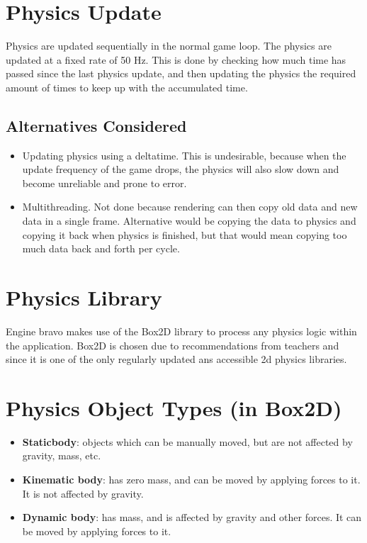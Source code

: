 \section{Physics Update}
Physics are updated sequentially in the normal game loop.
The physics are updated at a fixed rate of 50 Hz. This is done by checking how much time has passed since the last physics update, and then updating the physics the required amount of times to keep up with the accumulated time.

\subsection{Alternatives Considered}
\begin{itemize}
    \item Updating physics using a deltatime. This is undesirable, because when the update frequency of the game drops, the physics will also slow down and become unreliable and prone to error.
    \item Multithreading. Not done because rendering can then copy old data and new data in a single frame. Alternative would be copying the data to physics and copying it back when physics is finished, but that would mean copying too much data back and forth per cycle.
\end{itemize}

\section{Physics Library}
Engine bravo makes use of the Box2D library to process any physics logic within the application. Box2D is chosen due to recommendations from teachers and since it is one of the only regularly updated ans accessible 2d physics libraries.

\section{Physics Object Types (in Box2D)}
\begin{itemize}
    \item \textbf{Staticbody}: objects which can be manually moved, but are not affected by gravity, mass, etc.
    \item \textbf{Kinematic body}: has zero mass, and can be moved by applying forces to it. It is not affected by gravity.
    \item \textbf{Dynamic body}: has mass, and is affected by gravity and other forces. It can be moved by applying forces to it.
\end{itemize}

